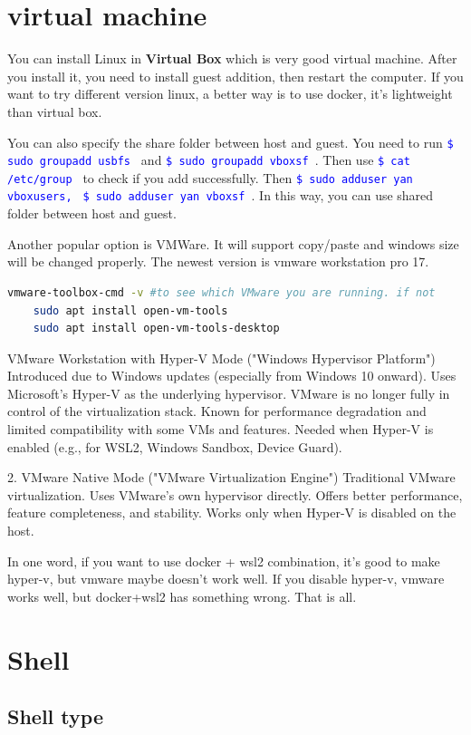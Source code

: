 \documentclass[paper=8.5in:11in, twoside, 12pt, pagesize=pdftex]{book}
\newcommand{\linuxcommand}[1]{\texttt{\textcolor{blue}{\$ #1 \Pisymbol{psy}{191}}}}
\begin{document}
 
\section{virtual machine}
You can install Linux in \textbf{Virtual Box} which is very good virtual machine. After you install it, you need to install guest addition, then restart the computer. If you want to try different version linux, a better way is to use docker, it's lightweight than virtual box. 

You can also specify the share folder between host and guest. You need to run \linuxcommand{sudo groupadd usbfs} and \linuxcommand{sudo groupadd vboxsf}. Then use \linuxcommand{cat /etc/group} to check if you add successfully. Then \linuxcommand{sudo adduser yan vboxusers,} \linuxcommand{sudo adduser yan vboxsf}. In this way, you can use shared folder between host and guest. 

Another popular option is VMWare. It will support copy/paste and windows size will be changed properly.
The newest version is vmware workstation pro 17.
\begin{lstlisting}[language=bash]
	vmware-toolbox-cmd -v #to see which VMware you are running. if not
	sudo apt install open-vm-tools
	sudo apt install open-vm-tools-desktop
\end{lstlisting}


VMware Workstation with Hyper-V Mode ("Windows Hypervisor Platform") Introduced due to Windows updates (especially from Windows 10 onward). Uses Microsoft's Hyper-V as the underlying hypervisor. VMware is no longer fully in control of the virtualization stack. Known for performance degradation and limited compatibility with some VMs and features. Needed when Hyper-V is enabled (e.g., for WSL2, Windows Sandbox, Device Guard).

2. VMware Native Mode ("VMware Virtualization Engine")
Traditional VMware virtualization. Uses VMware's own hypervisor directly. Offers better performance, feature completeness, and stability. Works only when Hyper-V is disabled on the host.

In one word, if you want to use docker + wsl2 combination, it's good to make hyper-v, but vmware maybe doesn't work well. If you disable hyper-v, vmware works well, but docker+wsl2 has something wrong.  That is all.

\section{Shell}
\subsection{Shell type}
\end{document}
